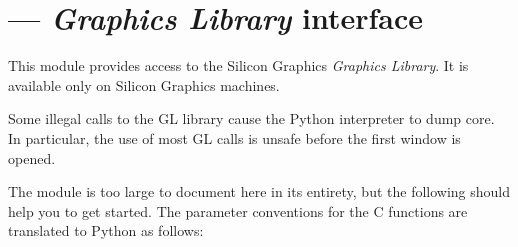 \section{ ---
         \emph{Graphics Library} interface}



This module provides access to the Silicon Graphics
\emph{Graphics Library}.
It is available only on Silicon Graphics machines.

Some illegal calls to the GL library cause the Python interpreter to dump
core.
In particular, the use of most GL calls is unsafe before the first
window is opened.

The module is too large to document here in its entirety, but the
following should help you to get started.
The parameter conventions for the C functions are translated to Python as
follows:

